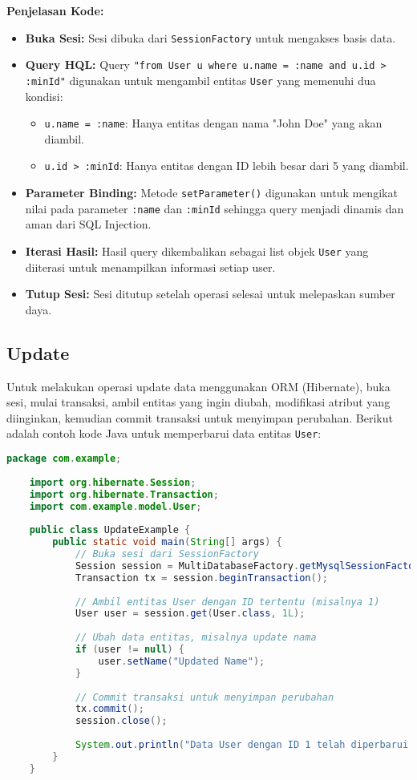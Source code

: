 \textbf{Penjelasan Kode:}
\begin{itemize}
	\item \textbf{Buka Sesi:} Sesi dibuka dari \texttt{SessionFactory} untuk mengakses basis data.
	\item \textbf{Query HQL:} Query \texttt{"from User u where u.name = :name and u.id > :minId"} digunakan untuk mengambil entitas \texttt{User} yang memenuhi dua kondisi:
	\begin{itemize}
		\item \texttt{u.name = :name}: Hanya entitas dengan nama "John Doe" yang akan diambil.
		\item \texttt{u.id > :minId}: Hanya entitas dengan ID lebih besar dari 5 yang diambil.
	\end{itemize}
	\item \textbf{Parameter Binding:} Metode \texttt{setParameter()} digunakan untuk mengikat nilai pada parameter \texttt{:name} dan \texttt{:minId} sehingga query menjadi dinamis dan aman dari SQL Injection.
	\item \textbf{Iterasi Hasil:} Hasil query dikembalikan sebagai list objek \texttt{User} yang diiterasi untuk menampilkan informasi setiap user.
	\item \textbf{Tutup Sesi:} Sesi ditutup setelah operasi selesai untuk melepaskan sumber daya.
\end{itemize}

\subsection{Update}

Untuk melakukan operasi update data menggunakan ORM (Hibernate), buka sesi, mulai transaksi, ambil entitas yang ingin diubah, modifikasi atribut yang diinginkan, kemudian commit transaksi untuk menyimpan perubahan. Berikut adalah contoh kode Java untuk memperbarui data entitas \texttt{User}:

\begin{lstlisting}[language=Java, style=JavaStyle]
	package com.example;
	
	import org.hibernate.Session;
	import org.hibernate.Transaction;
	import com.example.model.User;
	
	public class UpdateExample {
		public static void main(String[] args) {
			// Buka sesi dari SessionFactory
			Session session = MultiDatabaseFactory.getMysqlSessionFactory().openSession();
			Transaction tx = session.beginTransaction();
			
			// Ambil entitas User dengan ID tertentu (misalnya 1)
			User user = session.get(User.class, 1L);
			
			// Ubah data entitas, misalnya update nama
			if (user != null) {
				user.setName("Updated Name");
			}
			
			// Commit transaksi untuk menyimpan perubahan
			tx.commit();
			session.close();
			
			System.out.println("Data User dengan ID 1 telah diperbarui.");
		}
	}
\end{lstlisting}

